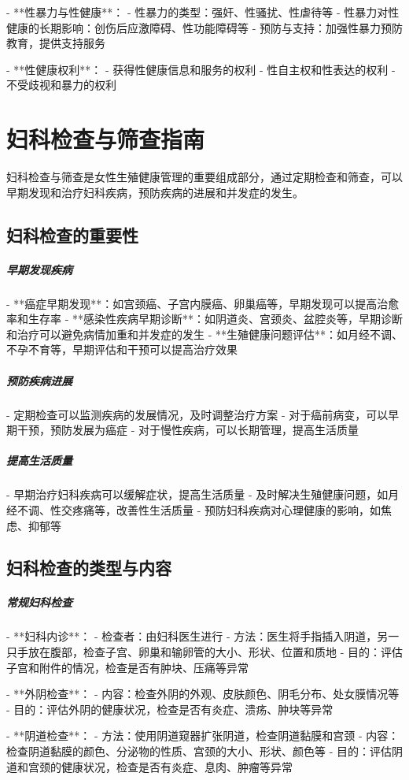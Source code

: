 \begin{enumerate}
- **性暴力与性健康**：
  - 性暴力的类型：强奸、性骚扰、性虐待等
  - 性暴力对性健康的长期影响：创伤后应激障碍、性功能障碍等
  - 预防与支持：加强性暴力预防教育，提供支持服务

- **性健康权利**：
  - 获得性健康信息和服务的权利
  - 性自主权和性表达的权利
  - 不受歧视和暴力的权利

\section{妇科检查与筛查指南}

妇科检查与筛查是女性生殖健康管理的重要组成部分，通过定期检查和筛查，可以早期发现和治疗妇科疾病，预防疾病的进展和并发症的发生。

\subsection{妇科检查的重要性}

\subparagraph{早期发现疾病}

- **癌症早期发现**：如宫颈癌、子宫内膜癌、卵巢癌等，早期发现可以提高治愈率和生存率
- **感染性疾病早期诊断**：如阴道炎、宫颈炎、盆腔炎等，早期诊断和治疗可以避免病情加重和并发症的发生
- **生殖健康问题评估**：如月经不调、不孕不育等，早期评估和干预可以提高治疗效果

\subparagraph{预防疾病进展}

- 定期检查可以监测疾病的发展情况，及时调整治疗方案
- 对于癌前病变，可以早期干预，预防发展为癌症
- 对于慢性疾病，可以长期管理，提高生活质量

\subparagraph{提高生活质量}

- 早期治疗妇科疾病可以缓解症状，提高生活质量
- 及时解决生殖健康问题，如月经不调、性交疼痛等，改善性生活质量
- 预防妇科疾病对心理健康的影响，如焦虑、抑郁等

\subsection{妇科检查的类型与内容}

\subparagraph{常规妇科检查}

- **妇科内诊**：
  - 检查者：由妇科医生进行
  - 方法：医生将手指插入阴道，另一只手放在腹部，检查子宫、卵巢和输卵管的大小、形状、位置和质地
  - 目的：评估子宫和附件的情况，检查是否有肿块、压痛等异常

- **外阴检查**：
  - 内容：检查外阴的外观、皮肤颜色、阴毛分布、处女膜情况等
  - 目的：评估外阴的健康状况，检查是否有炎症、溃疡、肿块等异常

- **阴道检查**：
  - 方法：使用阴道窥器扩张阴道，检查阴道黏膜和宫颈
  - 内容：检查阴道黏膜的颜色、分泌物的性质、宫颈的大小、形状、颜色等
  - 目的：评估阴道和宫颈的健康状况，检查是否有炎症、息肉、肿瘤等异常


\end{enumerate}
